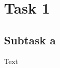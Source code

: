 \documentclass[a4paper,12pt]{article}
\begin{document}
\raggedright

\section{Task 1}

\subsection{Subtask a}

Text
\end{document}
